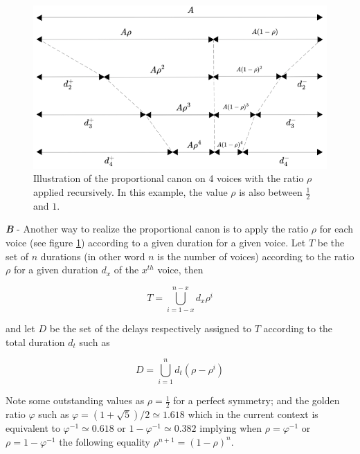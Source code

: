 \begin{figure}[h]
\begin{center}
\includegraphics[scale=0.8]{img/3498}
\caption{Illustration of the proportional canon on 4 voices with the ratio $\rho$ applied recursively. In this example, the value $\rho$ is also between $\frac{1}{2}$ and $1$. 
}
\label{canon2}
\end{center}
\end{figure}

  
\textbf{\textit{B}} - Another way to realize the proportional canon is to apply the ratio $\rho$ for each voice (see figure \ref{canon2}) according to a given duration for a given voice. Let $T$ be the set of $n$ durations (in other word $n$ is the number of voices) according to the ratio $\rho$ for a given duration $d_x$ of the $x^{th}$ voice, then

\[
T= \displaystyle \bigcup\limits_{i=1-x}^{n-x} d_x \rho^i 
 \]


\noindent and let $D$ be the set of the delays respectively assigned to $T$ according to the total duration $d_t$ such as

\[
     D =
   \displaystyle \bigcup\limits_{i=1}^{n} d_t (\rho-\rho^i) 
    \]

\bigskip

Note some outstanding values as $\rho=\frac{1}{2}$ for a perfect symmetry; and the golden ratio $\varphi$ such as $\varphi=(1+ \sqrt 5)/2 \simeq 1.618$ which in the current context is equivalent to $\varphi^{-1}  \simeq 0.618$ or $1-\varphi^{-1}  \simeq 0.382$ implying when $\rho=\varphi^{-1}$ or $\rho=1-\varphi^{-1}$ the following equality $\rho^{n+1}=(1-\rho)^{n}$. 

